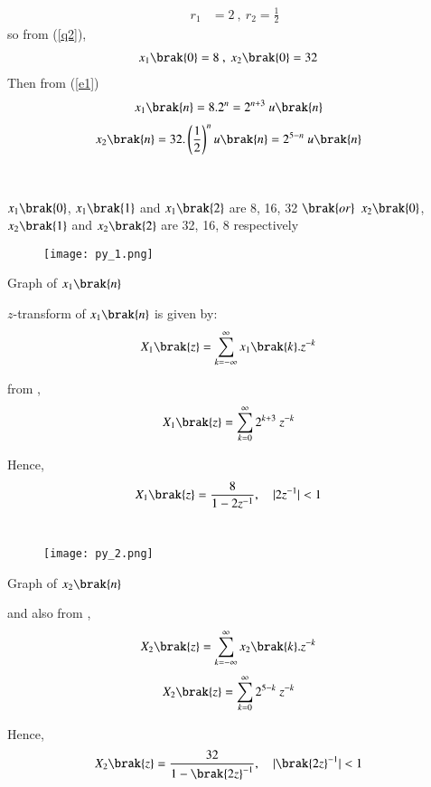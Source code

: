 \documentclass[beamer]{IEEEtran}
\theoremstyle{remark}
\begin{document}
\begin{align}
\label{q3}
r_1&=2\ ,\ r_2=\frac{1}{2}
\end{align}
so from (\ref{q2}),
\begin{align}x_1\brak{0}&=8\ ,\ x_2\brak{0}=32\end{align}
Then from (\ref{e1})
\begin{align}
    \label{a11}
    x_{1}\brak{n}&=8.2^{n}=2^{n+3}\ u\brak{n}
\end{align}
\begin{align}
    \label{a12}
    x_{2}\brak{n}=32.\left(\frac{1}{2}\right)^{n}u\brak{n}&=2^{5-n}\ u\brak{n}
\end{align}\\\\
$x_1\brak{0}$, $x_1\brak{1}$ and $x_1\brak{2}$ are 8, 16, 32 $\brak{or}$ $x_2\brak{0}$, $x_2\brak{1}$ and $x_2\brak{2}$ are 32, 16, 8 respectively
\begin{figure}[h]
    \centering
    \texttt{[image: py\_1.png]}
    \label{$2^{n+3}$}
\end{figure}

\begin{center}
    Graph of $x_1\brak{n}$
\end{center}
$z$-transform of $x_1\brak{n}$ is given by: 
\begin{align}
\label{a13}
    X_1\brak{z}&=\sum_{k=-\infty}^{\infty} x_1\brak{k}.z^{-k}
\end{align}

from \brak{\ref{a11}},
\begin{align}X_1\brak{z}&=\sum_{k=0}^{\infty}2^{k+3}\ z^{-k}\end{align}

Hence,
\begin{align}
X_1\brak{z}&=\frac{8}{1-2z^{-1}},\quad |2z^{-1}|<1
\end{align}\\

\begin{figure}[h]
    \centering
    \texttt{[image: py\_2.png]}
    \label{$2^{5-n}$}
\end{figure}

\begin{center}
    Graph of $x_2\brak{n}$
\end{center}

and also from \brak{\ref{a12}},\\
\begin{align}
    X_2\brak{z}&=\sum_{k=-\infty}^{\infty} x_2\brak{k}.z^{-k}
\end{align}
\begin{align}X_2\brak{z}&=\sum_{k=0}^{\infty} 2^{5-k}\ z^{-k}\end{align}

Hence,
\begin{align}X_2\brak{z}&=\frac{32}{1-{\brak{2z}^{-1}}},\quad |{\brak{2z}^{-1}}|<1 \end{align}
\end{document}
